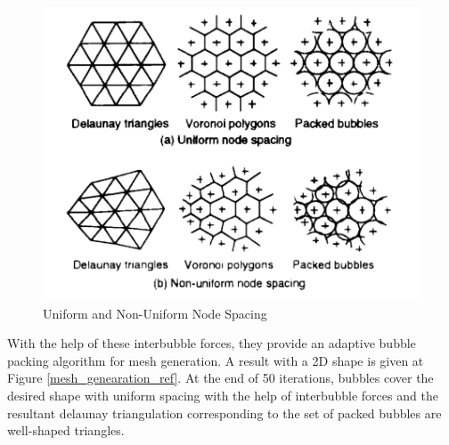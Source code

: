 \begin{figure}[H]
	\caption{Uniform and Non-Uniform Node Spacing \cite{27}} \label{tetrahedra}
	\centering
	\includegraphics[scale = 0.35]{nodespacing}
\end{figure}

With the help of these interbubble forces, they provide an adaptive bubble packing algorithm for mesh generation. A result with a 2D shape is given at Figure \ref{mesh_genearation_ref}. At the end of 50 iterations, bubbles cover the desired shape with uniform spacing with the help of interbubble forces and the resultant delaunay triangulation corresponding to the set of packed bubbles are well-shaped triangles. 


